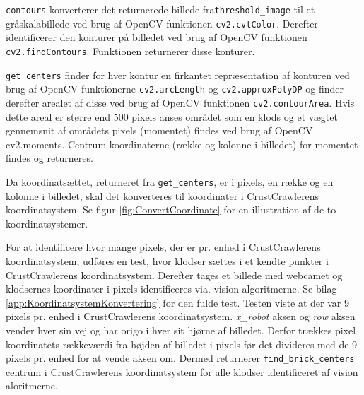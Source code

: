 \texttt{contours} konverterer det returnerede billede fra\newline \texttt{threshold\_image} til et gråskalabillede ved brug af OpenCV funktionen \texttt{cv2.cvtColor}.
Derefter identificerer den konturer på billedet ved brug af OpenCV funktionen \texttt{cv2.findContours}.
Funktionen returnerer disse konturer.

\texttt{get\_centers} finder for hver kontur en firkantet repræsentation af konturen ved brug af OpenCV funktionerne \texttt{cv2.arcLength} og \texttt{cv2.approxPolyDP} og finder derefter arealet af disse ved brug af OpenCV funktionen \texttt{cv2.contourArea}.
Hvis dette areal er større end 500 pixels anses området som en klods og et vægtet gennemsnit af områdets pixels (momentet) findes ved brug af OpenCV cv2.moments.
Centrum koordinaterne (række og kolonne i billedet) for momentet findes og returneres. 

Da koordinatsættet, returneret fra \texttt{get\_centers}, er i pixels, en række og en kolonne i billedet, skal det konverteres til koordinater i CrustCrawlerens koordinatsystem.
Se figur \vref{fig:ConvertCoordinate} for en illustration af de to koordinatsystemer.


For at identificere hvor mange pixels, der er pr. enhed i CrustCrawlerens koordinatsystem, udføres en test, hvor klodser sættes i et kendte punkter i CrustCrawlerens koordinatsystem.
Derefter tages et billede med webcamet og klodsernes koordinater i pixels identificeres via. vision algoritmerne.
Se bilag \vref{app:KoordinatsystemKonvertering} for den fulde test.
Testen viste at der var 9 pixels pr. enhed i CrustCrawlerens koordinatsystem.
\textit{x\_robot} aksen og \textit{row} aksen vender hver sin vej og har origo i hver sit hjørne af billedet.
Derfor trækkes pixel koordinatets rækkeværdi fra højden af billedet i pixels før det divideres med de 9 pixels pr. enhed for at vende aksen om.
Dermed returnerer \texttt{find\_brick\_centers} centrum i CrustCrawlerens koordinatsystem for alle klodser identificeret af vision aloritmerne.

